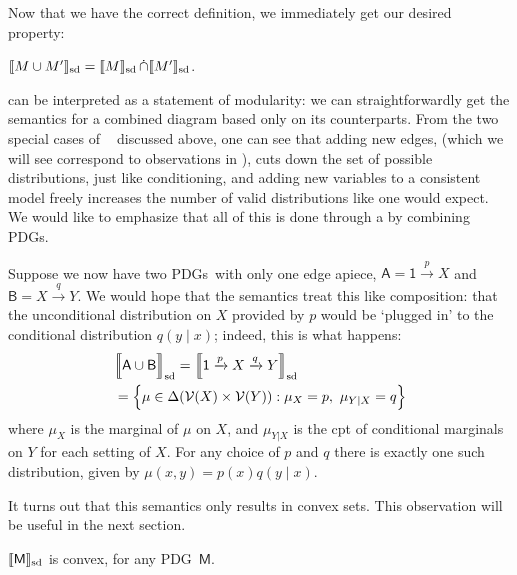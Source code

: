 \documentclass{article}
\newcommand\SD{_{\text{sd}}}
\DeclareMathOperator\dcap{\mathop{\dot\cap}}
\newcommand{\V}{\mathcal V}
\newcommand{\sfM}{\mathsf M}
\newcommand{\MN}{PDG}
\newcommand{\MNs}{\MN s}
\numberwithin{equation}{section}
\begin{document}
	
	Now that we have the correct definition, we immediately get our desired property:
	
	\begin{prop}\label{prop:union-set-semantics}
		$\bbr{M \cup M'}\SD = \bbr{M}\SD \dcap \bbr{M'}\SD$.
	\end{prop}

	 can be interpreted as a statement of modularity: we can straightforwardly get the semantics for a combined diagram based only on its counterparts. 
	From the two special cases of $\dcap$ discussed above, one can see that adding new edges, (which we will see correspond to observations in ), cuts down the set of possible distributions, just like conditioning, and adding new variables to a consistent model freely increases the number of valid distributions like one would expect. We would like to emphasize that all of this is done through a by combining \MNs.
	
	\begin{example}\label{ex:sd-compose-unconditional}
		Suppose we now have two \MNs\ with only one edge apiece, $\mathsf A = {\mathsf 1} \xrightarrow{p} X$ and $\mathsf B = X \xrightarrow{q} Y$. We would hope that the semantics treat this like composition: that the unconditional distribution on $X$ provided by $p$ would be `plugged in' to the conditional distribution $q(y \mid x)$; indeed, this is what happens:
		\begin{align*}
			&\bbr[\Big]{{\sf A \cup B}}\SD = \bbr[\Big]{{\mathsf 1} \xrightarrow{p} X \xrightarrow{q} Y}\SD \\
				&= \Big\{  \mu \in \Delta(\V(X) \times \V(Y)) : \mu_X = p,~\mu_{Y|X} = q \Big\} 
		\end{align*}
		where $\mu_X$ is the marginal of $\mu$ on $X$, and $\mu_{Y|X}$ is the cpt of conditional marginals on $Y$ for each setting of $X$.
		For any choice of $p$ and $q$ there is exactly one such distribution, given by $\mu(x,y) = p(x) q(y \mid x)$.
	\end{example}

	It turns out that this semantics only results in convex sets. This observation will be useful in the next section.
	\begin{lemma}[restate=thmsetconvex] 
		\label{prop:convex}
		$\bbr{\sfM}\SD$ is convex, for any \MN\ $\sfM$.
	\end{lemma}%
\end{document}
